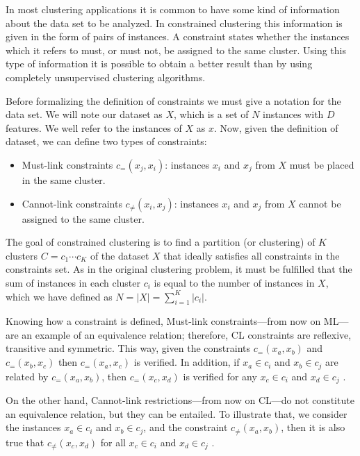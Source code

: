 \documentclass[review]{elsarticle}
\begin{document}
In most clustering applications it is common to have some kind of information about the data set to be analyzed. In constrained clustering this information is given in the form of pairs of instances. A constraint states whether the instances which it refers to must, or must not, be assigned to the same cluster. Using this type of information it is possible to obtain a better result than by using completely unsupervised clustering algorithms. 

Before formalizing the definition of constraints we must give a notation for the data set. We will note our dataset as $X$, which is a set of $N$ instances with $D$ features. We well refer to the instances of $X$ as $x$. Now, given the definition of dataset, we can define two types of constraints:

\begin{itemize}
	
	\item Must-link constraints $c_=(x_j,x_i)$: instances $x_i$ and $x_j$ from $X$ must be placed in the same cluster.
	
	\item Cannot-link constraints $c_{\neq}(x_i,x_j)$: instances $x_i$ and $x_j$ from $X$ cannot be assigned to the same cluster.
	
\end{itemize}

The goal of constrained clustering is to find a partition (or clustering) of $K$ clusters $C = {c_1 \cdots c_K}$ of the dataset $X$ that ideally satisfies all constraints in the constraints set. As in the original clustering problem, it must be fulfilled that the sum of instances in each cluster $c_i$ is equal to the number of instances in $X$, which we have defined as $N = |X| = \sum_{i = 1}^{K} |c_i| $.

Knowing how a constraint is defined, Must-link constraints---from now on ML---are an example of an equivalence relation; therefore, CL constraints are reflexive, transitive and symmetric. This way, given the constraints $c_=(x_a,x_b)$ and $c_=(x_b,x_c)$ then $c_=(x_a,x_c)$ is verified. In addition, if $x_a \in c_i$ and $x_b \in c_j$ are related by $c_=(x_a,x_b)$, then $c_=(x_c,x_d)$ is verified for any $x_c \in c_i$ and $x_d \in c_j$ \cite{xu2013improving}\cite{davidson2007survey}.

On the other hand, Cannot-link restrictions---from now on CL---do not constitute an equivalence relation, but they can be entailed. To illustrate that, we consider the instances $x_a \in c_i$ and $x_b \in c_j$, and the constraint $c_{\neq}(x_a,x_b)$, then it is also true that $c_{\neq}(x_c,x_d)$ for all $x_c \in c_i$ and $x_d \in c_j$ \cite{davidson2007survey}. 
\end{document}
